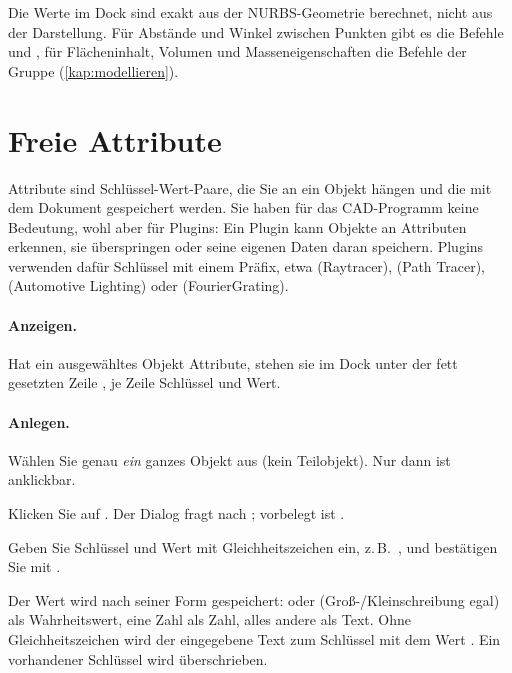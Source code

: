 \begin{tipp}
Die Werte im Dock  sind exakt aus der NURBS-Geometrie berechnet, nicht aus
der Darstellung. Für Abstände und Winkel zwischen Punkten gibt es die Befehle 
und , für Flächeninhalt, Volumen und Masseneigenschaften die Befehle der Gruppe
 (\autoref{kap:modellieren}).
\end{tipp}

\section{Freie Attribute}\label{sec:attribute}

Attribute sind Schlüssel-Wert-Paare, die Sie an ein Objekt hängen und die mit dem Dokument
gespeichert werden. Sie haben für das CAD-Programm keine Bedeutung, wohl aber für Plugins: Ein
Plugin kann Objekte an Attributen erkennen, sie überspringen oder seine eigenen Daten daran
speichern. Plugins verwenden dafür Schlüssel mit einem Präfix, etwa  (Raytracer),
 (Path Tracer),  (Automotive Lighting) oder  (FourierGrating).

\paragraph{Anzeigen.} Hat ein ausgewähltes Objekt Attribute, stehen sie im Dock
 unter der fett gesetzten Zeile , je Zeile Schlüssel und
Wert.

\paragraph{Anlegen.}
\begin{schritte}
  \item Wählen Sie genau \emph{ein} ganzes Objekt aus (kein Teilobjekt). Nur dann ist
     anklickbar.
  \item Klicken Sie auf . Der Dialog  fragt nach
    ; vorbelegt ist .
  \item Geben Sie Schlüssel und Wert mit Gleichheitszeichen ein, z.\,B.\
    , und bestätigen Sie mit .
\end{schritte}

Der Wert wird nach seiner Form gespeichert:  oder  (Groß-/Kleinschreibung
egal) als Wahrheitswert, eine Zahl als Zahl, alles andere als Text. Ohne Gleichheitszeichen
wird der eingegebene Text zum Schlüssel mit dem Wert \code{true}. Ein vorhandener Schlüssel
wird überschrieben.

